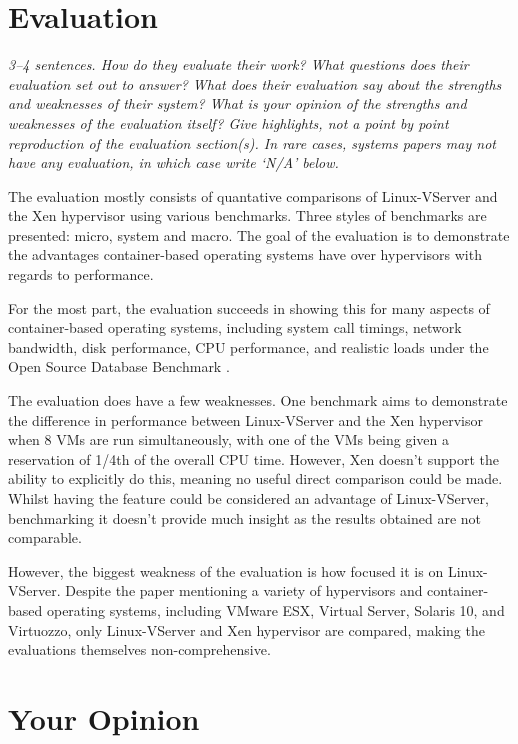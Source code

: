 \documentclass[11pt]{article}
\begin{document}
\section*{Evaluation}

\textsl{3--4 sentences. How do they evaluate their work? What questions does
their evaluation set out to answer? What does their evaluation say about the
strengths and weaknesses of their system? What is your opinion of the strengths
and weaknesses of the evaluation itself? Give highlights, not a point by point
reproduction of the evaluation section(s). In rare cases, systems papers may
not have any evaluation, in which case write `N/A' below.}

The evaluation mostly consists of quantative comparisons of Linux-VServer and
the Xen hypervisor using various benchmarks. Three styles of benchmarks are
presented: micro, system and macro. The goal of the evaluation is to
demonstrate the advantages container-based operating systems have over
hypervisors with regards to performance.

For the most part, the evaluation succeeds in showing this for many aspects of
container-based operating systems, including system call timings, network
bandwidth, disk performance, CPU performance, and realistic loads under the
Open Source Database Benchmark \cite{OSDB}.

The evaluation does have a few weaknesses. One benchmark aims to demonstrate
the difference in performance between Linux-VServer and the Xen hypervisor when
8 VMs are run simultaneously, with one of the VMs being given a reservation of
1/4th of the overall CPU time. However, Xen doesn't support the ability to
explicitly do this, meaning no useful direct comparison could be made. Whilst
having the feature could be considered an advantage of Linux-VServer,
benchmarking it doesn't provide much insight as the results obtained are not
comparable.

However, the biggest weakness of the evaluation is how focused it is on
Linux-VServer. Despite the paper mentioning a variety of hypervisors and
container-based operating systems, including VMware ESX, Virtual Server,
Solaris 10, and Virtuozzo, only Linux-VServer and Xen hypervisor are compared,
making the evaluations themselves non-comprehensive.

\section*{Your Opinion}
\end{document}
